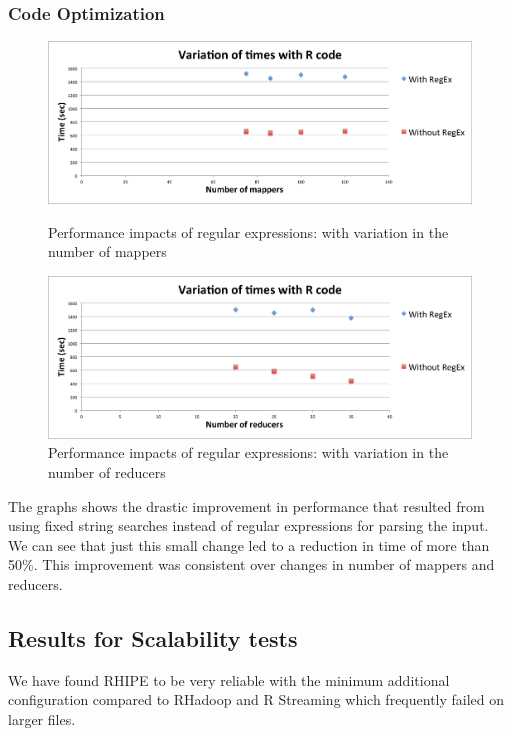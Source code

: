 \documentclass[
journal=jacsat, %
manuscript=article]{achemso}
\begin{document}
\subsubsection{Code Optimization}
\begin{figure}[!htb]
  \includegraphics[width=\linewidth]{Regex_mappers.png}
  \caption{Performance impacts of regular expressions: with variation in the number of mappers}\label{fig:Regex_mappers}
\endminipage\hfill
{}
  \includegraphics[width=\linewidth]{RegEx_reducers.png}
  \caption{Performance impacts of regular expressions: with variation in the number of reducers}\label{fig:RegEx_reducers}
\endminipage\hfill

\end{figure}
The graphs shows the drastic improvement in performance that resulted from using fixed string searches instead of regular expressions for parsing the input. We can see that just this small change led to a reduction in time of more than 50\%. This improvement was consistent over changes in number of mappers and reducers. 

\subsection{Results for Scalability tests}
We have found RHIPE to be very reliable with the minimum additional configuration compared to RHadoop and R Streaming which frequently failed on larger files. 
\end{document}
